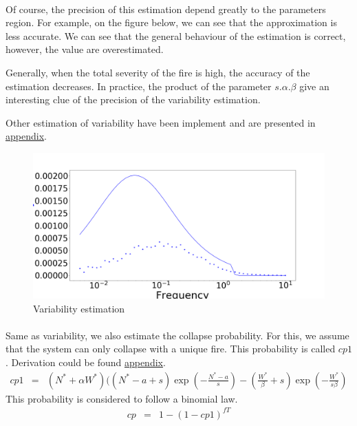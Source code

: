 \documentclass{article}
\begin{document}
\paragraph{}
Of course, the precision of this estimation depend greatly to the parameters region. For example, on the figure below, we can see that the approximation is less accurate. We can see that the general behaviour of the estimation is correct, however, the value are overestimated.

Generally, when the total severity of the fire is high, the accuracy of the estimation decreases. In practice, the product of the parameter $s.\alpha.\beta$ give an interesting clue of the precision of the variability estimation.

Other estimation of variability have been implement and are presented in \hyperref[variability_estimation_other]{appendix}.

\begin{figure}[h!]
\centering
\includegraphics[width=10.cm]{variability_bad.png}
\caption{Variability estimation}
\end{figure}


\paragraph{}
Same as variability, we also estimate the collapse probability. For this, we assume that the system can only collapse with a unique fire. This probability is called $cp1$. Derivation could be found \hyperref[cp_derivation]{appendix}.
\[
\begin{array}{rcl}
cp1 & = & (N^*+\alpha W^*)((N^*-a+s)\exp(-\frac{N^*-a}{s}) - (\frac{W^*}{\beta}+s)\exp(-\frac{W^*}{s\beta})
\end{array}
\]
This probability is considered to follow a binomial law.
\[
\begin{array}{rcl}
cp & = & 1-(1-cp1)^{fT} \\
\end{array}
\]
\end{document}
